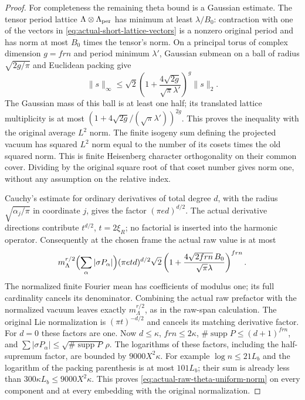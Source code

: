 \begin{proof}
For completeness the remaining theta bound is a Gaussian estimate.
The tensor period lattice $\Lambda\otimes\Lambda_{\rm per}$ has
minimum at least $\lambda/B_0$: contraction with one of the vectors
in \eqref{eq:actual-short-lattice-vectors} is a nonzero original
period and has norm at most $B_0$ times the tensor's norm.
On a principal torus of complex dimension $g=frn$ and period minimum
$\lambda'$, Gaussian submean on a ball of radius $\sqrt{2g/\pi}$
and Euclidean packing give
\[
 \|s\|_\infty\le\sqrt2
   \left(1+\frac{4\sqrt{2g}}{\sqrt\pi\lambda'}\right)^g
   \|s\|_2.
\]
The Gaussian mass of this ball is at least one half; its translated
lattice multiplicity is at most
$(1+4\sqrt{2g}/(\sqrt\pi\lambda'))^{2g}$.
This proves the inequality with the original average $L^2$ norm.
The finite isogeny sum defining the projected vacuum has squared
$L^2$ norm equal to the number of its cosets times the old squared
norm.  This is finite Heisenberg character orthogonality on their
common cover.  Dividing by the original square root of that coset
number gives norm one, without any assumption on the relative index.

Cauchy's estimate for ordinary derivatives of total degree $d$, with
the radius $\sqrt{\alpha_j/\pi}$ in coordinate $j$, gives the
factor $(\pi e d)^{d/2}$.  The actual derivative directions contribute
$t^{d/2}$, $t=2\xi_R$; no factorial is inserted into the harmonic
operator.  Consequently at the chosen frame the actual raw value is
at most
\[
 m_\Lambda^{r/2}\Bigl(\sum_\alpha|\sigma P_\alpha|\Bigr)
 (\pi e t d)^{d/2}\sqrt2
 \left(1+\frac{4\sqrt{2frn}\,B_0}{\sqrt\pi\lambda}\right)^{frn}.
\]
The normalized finite Fourier mean has coefficients of modulus one;
its full cardinality cancels its denominator.  Combining the actual
raw prefactor with the normalized vacuum leaves exactly
$m_\Lambda^{r/2}$, as in the raw-span calculation.  The original
Lie normalization is $(\pi t)^{-d/2}$ and cancels its matching
derivative factor.  For $d=0$ these factors are one.
Now $d\le\kappa$, $frn\le2\kappa$,
$\#\operatorname{supp}P\le(d+1)^{frn}$, and
$\sum|\sigma P_\alpha|\le\sqrt{\#\operatorname{supp}P}\,\rho$.
The logarithms of these factors, including the half-supremum factor,
are bounded by $9000X^2\kappa$.  For example
$\log n\le21L_b$ and the logarithm of the packing parenthesis
is at most $101L_b$; their sum is already less than
$300\kappa L_b\le9000X^2\kappa$.
This proves \eqref{eq:actual-raw-theta-uniform-norm} on every component
and at every embedding with the original normalization.


\end{proof}
